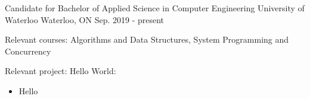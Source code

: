 

\begin{cventries}

  \cventry
    {Candidate for Bachelor of Applied Science in Computer Engineering} %
    {University of Waterloo} %
    {Waterloo, ON} %
    {Sep. 2019 - present} %
    {
      \begin{cvitems} %
        \item {Relevant courses: Algorithms and Data Structures, System Programming and Concurrency}
        \item {
        	Relevant project: Hello World:
        }
	    \begin{itemize}[leftmargin=2ex, nosep, noitemsep]
	    	\item {Hello}
	    \end{itemize}
      \end{cvitems}
    }

\end{cventries}

